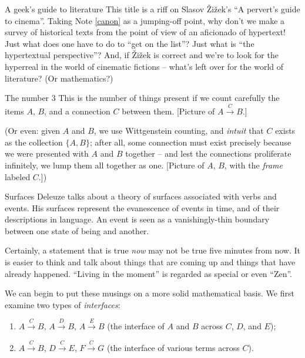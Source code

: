 \begin{notate}{A geek's guide to literature}
This title is a riff on Slasov \v{Z}i\v{z}ek's ``A
pervert's guide to cinema''.  Taking Note \ref{canon} as a
jumping-off point, why don't we make a survey of
historical texts from the point of view of an aficionado
of hypertext!  Just what does one have to do to ``get on
the list''?  Just what is ``the hypertextual
perspective''?  And, if \v{Z}i\v{z}ek is correct and we're
to look for the hyperreal in the world of cinematic
fictions -- what's left over for the world of literature?
(Or mathematics?)
\end{notate}

\begin{notate}{The number 3}
This is the number of things present if we count carefully
the items $A$, $B$, and a connection $C$ between them.
[Picture of $A\xrightarrow{C} B$.]

(Or even: given $A$ and $B$, we use Wittgenstein counting,
and \emph{intuit} that $C$ exists as the collection $\{A,
B\}$; after all,
  some connection must exist precisely because we were
  presented with $A$ and $B$ together -- and lest the
  connections proliferate infinitely, we lump them all
  together as one.  [Picture of $A$, $B$,
    with the \emph{frame} labeled $C$.])
\end{notate}

\begin{notate}{Surfaces}
Deleuze talks about a theory of surfaces associated with
verbs and events.  His surfaces represent the evanescence
of events in time, and of their descriptions in language.
An event is seen as a vanishingly-thin boundary between
one state of being and another.

Certainly, a statement that is true \emph{now} may not be
true five minutes from now.  It is easier to think and
talk about things that are coming up and things that have
already happened.  ``Living in the moment'' is regarded as
special or even ``Zen''.

We can begin to put these musings on a more solid
mathematical basis.  We first examine two types of
\emph{interfaces}:
\begin{enumerate}
\item $A\xrightarrow{C} B$, $A\xrightarrow{D} B$,
  $A\xrightarrow{E} B$
  (the interface of $A$ and $B$ across $C$, $D$, and $E$);
\item $A\xrightarrow{C} B$, $D\xrightarrow{C} E$,
  $F\xrightarrow{C} G$
  (the interface of various terms across $C$).
\end{enumerate}
\end{notate}

